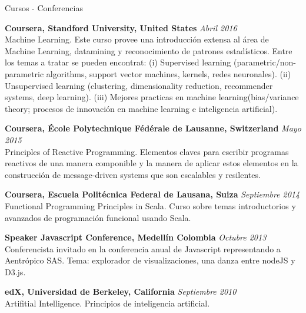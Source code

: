 \documentclass[spanish]{resume} %
\begin{document}
\begin{rSection}{Cursos - Conferencias}


{\bf Coursera, Standford University, United States} \hfill {\em Abril 2016} \\
Machine Learning.
Este curso provee una introducción extensa al área de Machine Learning, datamining y reconocimiento de patrones estadísticos. Entre los temas a tratar se pueden encontrat: (i) Supervised learning (parametric/non-parametric algorithms, support vector machines, kernels, redes neuronales). (ii) Unsupervised learning (clustering, dimensionality reduction, recommender systems, deep learning). (iii) Mejores practicas en machine learning(bias/variance theory; procesos de innovación en machine learning e inteligencia artificial).


{\bf Coursera, \'Ecole Polytechnique F\'ed\'erale de Lausanne, Switzerland} \hfill {\em Mayo 2015} \\
Principles of Reactive Programming.
Elementos claves para escribir programas reactivos de una manera componible y la manera de aplicar estos elementos en la construcción de message-driven systems que son escalables y resilentes. 


{\bf Coursera, Escuela Polit\'ecnica Federal de Lausana, Suiza} \hfill {\em Septiembre 2014} \\
Functional Programming Principles in Scala.
Curso sobre temas introductorios y avanzados de programaci\'on funcional usando Scala.

{\bf Speaker Javascript Conference, Medell\'in Colombia} \hfill {\em Octubre 2013} \\
Conferencista invitado en la conferencia anual de Javascript representando a Aentr\'opico SAS.
Tema: explorador de visualizaciones, una danza entre nodeJS y D3.js.

{\bf edX, Universidad de Berkeley, California} \hfill {\em Septiembre 2010} \\
Artifitial Intelligence.
Principios de inteligencia artificial.

\end{rSection}
\end{document}

